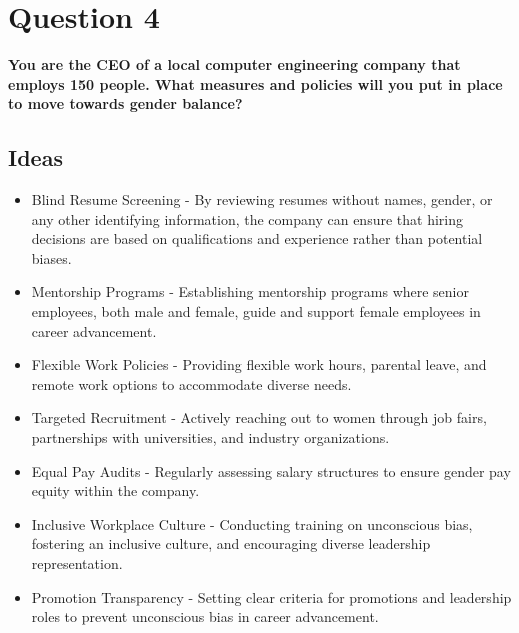 \documentclass{article}
\begin{document}
\section{Question 4}
\textbf{You are the CEO of a local computer engineering company that employs 150 people. What measures and policies will you put in place to move towards gender balance?}
\subsection{Ideas}
\begin{itemize}
    \item Blind Resume Screening - By reviewing resumes without names, gender, or any other identifying information, the company can ensure that hiring decisions are based on qualifications and experience rather than potential biases.
    \item Mentorship Programs - Establishing mentorship programs where senior employees, both male and female, guide and support female employees in career advancement.
    \item Flexible Work Policies - Providing flexible work hours, parental leave, and remote work options to accommodate diverse needs.
    \item Targeted Recruitment - Actively reaching out to women through job fairs, partnerships with universities, and industry organizations.
    \item Equal Pay Audits - Regularly assessing salary structures to ensure gender pay equity within the company.
    \item Inclusive Workplace Culture - Conducting training on unconscious bias, fostering an inclusive culture, and encouraging diverse leadership representation.
    \item Promotion Transparency - Setting clear criteria for promotions and leadership roles to prevent unconscious bias in career advancement.
\end{itemize}
\end{document}

